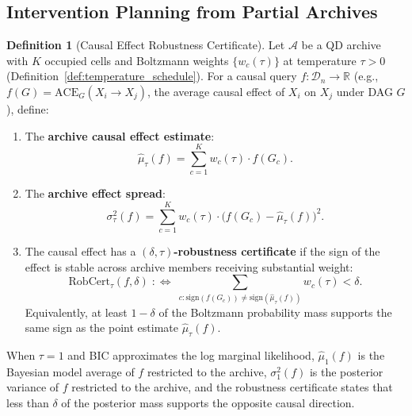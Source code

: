 \documentclass{article}
\theoremstyle{definition}
\newtheorem{definition}{Definition}
\theoremstyle{plain}
\theoremstyle{remark}
\begin{document}
\subsection{Intervention Planning from Partial Archives}
\label{subsec:intervention_planning}

\begin{definition}[Causal Effect Robustness Certificate]
\label{def:causal_robustness}
Let $\mathcal{A}$ be a QD archive with $K$ occupied cells and Boltzmann weights
$\{w_c(\tau)\}$ at temperature $\tau > 0$ (Definition~\ref{def:temperature_schedule}).
For a causal query $f : \mathcal{D}_n \to \mathbb{R}$ (e.g., $f(G) = \mathrm{ACE}_G(X_i \to X_j)$,
the average causal effect of $X_i$ on $X_j$ under DAG $G$), define:

\begin{enumerate}
  \item[(i)] The \textbf{archive causal effect estimate}:
    \begin{equation}
      \hat{\mu}_\tau(f) = \sum_{c=1}^K w_c(\tau) \cdot f(G_c).
    \end{equation}
  \item[(ii)] The \textbf{archive effect spread}:
    \begin{equation}
      \sigma_\tau^2(f) = \sum_{c=1}^K w_c(\tau) \cdot \bigl(f(G_c) - \hat{\mu}_\tau(f)\bigr)^2.
    \end{equation}
  \item[(iii)] The causal effect has a \textbf{$(\delta, \tau)$-robustness certificate} if
    the sign of the effect is stable across archive members receiving substantial weight:
    \begin{equation}
      \mathrm{RobCert}_\tau(f, \delta) \;:\Longleftrightarrow\;
      \sum_{c : \mathrm{sign}(f(G_c)) \neq \mathrm{sign}(\hat{\mu}_\tau(f))} w_c(\tau) < \delta.
    \end{equation}
    Equivalently, at least $1 - \delta$ of the Boltzmann probability mass supports the
    same sign as the point estimate $\hat{\mu}_\tau(f)$.
\end{enumerate}

When $\tau = 1$ and BIC approximates the log marginal likelihood, $\hat{\mu}_1(f)$ is the
Bayesian model average of $f$ restricted to the archive, $\sigma_1^2(f)$ is the posterior
variance of $f$ restricted to the archive, and the robustness certificate states that
less than $\delta$ of the posterior mass supports the opposite causal direction.
\end{definition}
\end{document}
